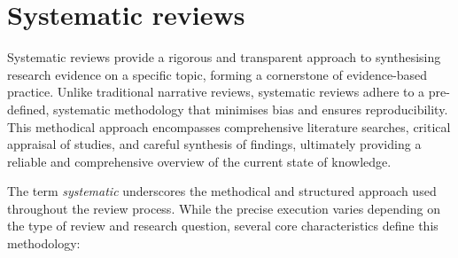\documentclass[10pt,oneside]{book}
\begin{document}
\section{Systematic reviews}

Systematic reviews provide a rigorous and transparent approach to synthesising research evidence on a specific topic, forming a cornerstone of evidence-based practice. Unlike traditional narrative reviews, systematic reviews adhere to a pre-defined, systematic methodology that minimises bias and ensures reproducibility. This methodical approach encompasses comprehensive literature searches, critical appraisal of studies, and careful synthesis of findings, ultimately providing a reliable and comprehensive overview of the current state of knowledge.

The term \emph{systematic} underscores the methodical and structured approach used throughout the review process. While the precise execution varies depending on the type of review and research question, several core characteristics define this methodology:
\end{document}

